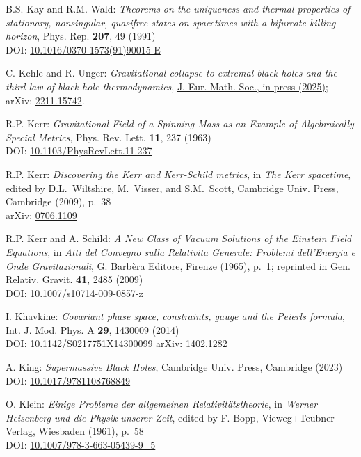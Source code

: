 \begin{thebibliography}{123}
B.S. Kay and R.M. Wald:
{\em Theorems on the uniqueness and thermal properties of stationary, nonsingular, quasifree states on spacetimes with a bifurcate killing horizon},
Phys. Rep. {\bf 207}, 49 (1991)\\
DOI: \href{https://doi.org/10.1016/0370-1573(91)90015-E}{10.1016/0370-1573(91)90015-E}

C. Kehle and R. Unger:
{\em Gravitational collapse to extremal black holes and the third law of black hole thermodynamics},
\href{https://doi.org/10.4171/jems/1591}{J. Eur. Math. Soc., in press (2025)};
arXiv: \href{https://arxiv.org/abs/2211.15742}{2211.15742}.

R.P. Kerr:
{\em Gravitational Field of a Spinning Mass as an Example of Algebraically Special Metrics},
Phys. Rev. Lett. {\bf 11}, 237 (1963)\\
DOI: \href{https://doi.org/10.1103/PhysRevLett.11.237}{10.1103/PhysRevLett.11.237}

R.P. Kerr: {\em Discovering the Kerr and Kerr-Schild metrics},
in {\em The Kerr spacetime}, edited by D.L.~Wiltshire, M.~Visser, and S.M.~Scott,
Cambridge Univ. Press, Cambridge (2009), p.~38\\
arXiv: \href{https://arxiv.org/abs/0706.1109}{0706.1109}

R.P. Kerr and A. Schild:
{\em A New Class of Vacuum Solutions of the Einstein Field Equations},
in {\em Atti del Convegno sulla Relativita Generale: Problemi
dell’Energia e Onde Gravitazionali}, G. Barbèra Editore,
Firenze (1965), p.~1; reprinted in
Gen. Relativ. Gravit. {\bf 41}, 2485 (2009)\\
DOI: \href{https://doi.org/10.1007/s10714-009-0857-z}{10.1007/s10714-009-0857-z}

I. Khavkine:
{\em Covariant phase space, constraints, gauge and the Peierls formula},
Int. J. Mod. Phys. A  {\bf 29}, 1430009 (2014)\\
DOI: \href{https://doi.org/10.1142/S0217751X14300099}{10.1142/S0217751X14300099}\hfill
arXiv: \href{https://arxiv.org/abs/1402.1282}{1402.1282}

A. King:
{\em Supermassive Black Holes},
Cambridge Univ. Press, Cambridge (2023)\\
DOI: \href{https://doi.org/10.1017/9781108768849}{10.1017/9781108768849}

O. Klein:
{\em Einige Probleme der allgemeinen Relativitätstheorie},
in {\em Werner Heisenberg und die Physik unserer Zeit},
edited by F. Bopp, Vieweg+Teubner Verlag, Wiesbaden (1961), p.~58\\
DOI: \href{https://doi.org/10.1007/978-3-663-05439-9_5}{10.1007/978-3-663-05439-9\_5}


\end{thebibliography}
